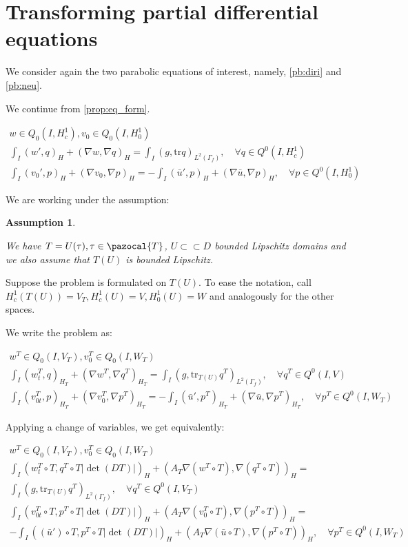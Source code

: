 \documentclass[english,a4paper,10pt,oneside]{scrbook}	%
\theoremstyle{break}
\newtheorem{ass}[equation]{Assumption}
\theoremstyle{remark}
\newcommand{\tr}{\text{tr}}
\newcommand{\cc}{\subset\subset}
\newcommand{\cT}{\pazocal{T}}
\begin{document}
\section{Transforming partial differential equations}

We consider again the two parabolic equations of interest, namely, \cref{pb:diri} and \cref{pb:neu}.

We continue from \cref{prop:eq_form}.

\begin{align*}
w \in Q_0(I, H^1_c), v_0 \in Q_0(I,H^1_0) \\
\int_I ( w' , q)_H+ (\nabla w, \nabla q)_H = \int_I(g,\tr q)_{L^2(\Gamma_f)}, \quad \forall q \in Q^0(I, H^1_c) \\
\int_I (v_0',p)_H + (\nabla v_0, \nabla p)_H= -\int_I(\bar{u}',p)_H+(\nabla \bar{u}, \nabla p)_H, \quad \forall p \in Q^0(I, H^1_0) 
\end{align*}

We are working under the assumption:

\begin{ass}
\label{ass:pull}

We have $T=U(\tau), \tau \in \cT$, $U\cc D$ bounded Lipschitz domains and we also assume that $T(U)$ is bounded Lipschitz.
\end{ass}

Suppose the problem is formulated on $T(U)$. To ease the notation, call $H^1_c(T(U))=V_T, H^1_c(U)=V, H^1_0(U)=W$ and analogously for the other spaces.

We write the problem as:

\begin{align*}
w^T \in Q_0(I, V_T), v_0^T \in Q_0(I,W_T) \\
\int_I  (w^T_t , q)_{H_T}+ (\nabla w^T, \nabla q^T)_{H_T} = \int_I(g,\tr_{T(U)} q^T)_{L^2(\Gamma_f)}, \quad \forall q^T \in Q^0(I, V) \\
\int_I (v^T_{0t},p)_{H_T} + (\nabla v_0^T, \nabla p^T)_{H_T}= -\int_I(\bar{u}',p^T)_{H_T}+(\nabla \bar{u}, \nabla p^T)_{H_T}, \quad \forall p^T \in Q^0(I, W_T)
\end{align*}

Applying a change of variables, we get equivalently:

\begin{align*}
w^T \in Q_0(I, V_T), v_0^T \in Q_0(I,W_T) \\
\int_I (w^T_t\circ T, q^T\circ T |\det(DT)|)_H+ (A_T\nabla (w^T\circ T), \nabla( q^T\circ T))_{H} =\\ \int_I(g,\tr_{T(U)} q^T)_{L^2(\Gamma_f)}, \quad \forall q^T \in Q^0(I, V_T) \\
\int_I(v_{0t}^T\circ T,p^T\circ T |\det(DT)|)_H + (A_T \nabla (v_0^T\circ T), \nabla( p^T\circ T))_{H}=\\ -\int_I((\bar{u}')\circ T,p^T\circ T |\det(DT)|)_{H}+(A_T \nabla (\bar{u} \circ T), \nabla (p^T\circ T))_{H}, \quad \forall p^T \in Q^0(I, W_T)
\end{align*}
\end{document}

